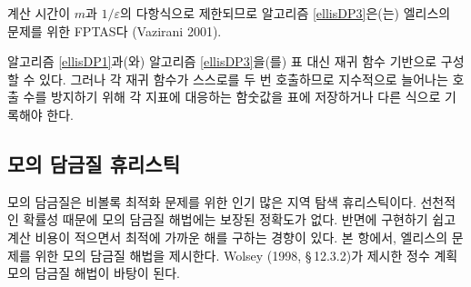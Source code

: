 \documentclass[11pt]{article} %
\newif\ifen
\theoremstyle{definition}
\theoremstyle{definition}
\begin{document}
\ifen
Since its time complexity is polynomial in $m$ and $1 / \varepsilon$, Algorithm \ref{ellisDP3} is an FPTAS for Ellis's problem (Vazirani 2001). 

Algorithms \ref{ellisDP1} and \ref{ellisDP3} can be written using recursive functions instead of lookup tables. However, since each function references itself \emph{twice,} the function values at each index must be recorded in a lookup table or memoized to prevent an exponential number of calls from forming on the stack.
\else
계산 시간이 $m$과 $1 / \varepsilon$의 다항식으로 제한되므로  알고리즘 \ref{ellisDP3}은(는) 엘리스의 문제를 위한 FPTAS다 (Vazirani 2001). 

알고리즘 \ref{ellisDP1}과(와) 알고리즘 \ref{ellisDP3}을(를) 표 대신 재귀 함수 기반으로 구성할 수 있다. 그러나 각 재귀 함수가 스스로를 두 번 호출하므로 지수적으로 늘어나는 호출 수를 방지하기 위해 각 지표에 대응하는 함숫값을 표에 저장하거나 다른 식으로 기록해야 한다.
\fi


\ifen \subsection{Simulated annealing heuristic} \else \subsection{모의 담금질 휴리스틱}\fi\label{numericalexperiments}
\ifen
Simulated annealing is a popular local-search heuristic for nonconvex optimization problems. Because of their inherent randomness, simulated-annealing algorithms offer no accuracy guarantee; however, they are easy to implement, computationally inexpensive, and often produce solutions with a small optimality gap. In this section, we present a simulated-annealing algorithm for Ellis's problem. It is based on the procedure for integer programs outlined by Wolsey (1998, \S\,12.3.2).
\else
모의 담금질은 비볼록 최적화 문제를 위한 인기 많은 지역 탐색 휴리스틱이다. 선천적인 확률성 때문에 모의 담금질 해법에는 보장된 정확도가 없다. 반면에 구현하기 쉽고 계산 비용이 적으면서 최적에 가까운 해를 구하는 경향이 있다. 본 항에서, 엘리스의 문제를 위한 모의 담금질 해법을 제시한다. Wolsey (1998, \S\,12.3.2)가 제시한 정수 계획 모의 담금질 해법이 바탕이 된다.
\fi
\end{document}

